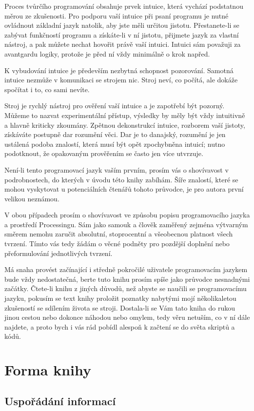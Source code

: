 \documentclass[10pt]{book}
\newcommand{\oddil}[1]{\section{#1}\index{#1}\label{#1}}
\newcommand{\pododdil}[1]{\subsection{#1}\index{#1}\label{#1}}
\begin{document}
Proces tvůrčího programování obsahuje prvek intuice, která vychází podstatnou měrou ze zkušenosti. Pro podporu vaší intuice při psaní programu je nutné ovládnout základní jazyk natolik, aby jste měli určitou jistotu. Přestanete-li se zabývat funkčností programu a získáte-li v ní jistotu, přijmete jazyk za vlastní nástroj, a pak můžete nechat hovořit právě vaší intuici. Intuici sám považuji za avantgardu logiky, protože je před ní vždy minimálně o krok napřed.

K vybudování intuice je především nezbytná schopnost pozorování. Samotná intuice nezmůže v komunikaci se strojem nic. Stroj neví, co počítá, ale dokáže spočítat i to, co sami nevíte.

Stroj je rychlý nástroj pro ověření vaší intuice a je zapotřebí být pozorný. Můžeme to nazvat experimentální přístup, výsledky by měly být vždy intuitivně a hlavně kriticky zkoumány. Zpětnou dekonstrukcí intuice, rozborem vaší jistoty, získáváte postupně dar rozumění věci. Dar je to danajský, rozumění je jen ustálená podoba znalostí, která musí být opět zpochybněna intuicí; nutno podotknout, že opakovaným prověřením se často jen více utvrzuje. 

Není-li tento programovací jazyk vaším prvním, prosím vás o shovívavost v podrobnostech, do kterých v úvodu této knihy zabíhám. Šíře znalostí, které se mohou vyskytovat u potenciálních čtenářů tohoto průvodce, je pro autora první velikou neznámou.

V obou případech prosím o shovívavost ve způsobu popisu programovacího jazyka a prostředí Processingu. Sám jako samouk a člověk zaměřený zejména výtvarným směrem nemohu zaručit absolutní, stoprocentní a všeobecnou platnost všech tvrzení. Tímto vás tedy žádám o věcné podněty pro pozdější doplnění nebo přeformulování jednotlivých tvrzení.

Má snaha provést začínající i středně pokročilé uživatele programovacím jazykem bude vždy nedostatečná, berte tuto knihu prosím spíše jako průvodce nesnadnými začátky. Čtete-li knihu z jiných důvodů, než abyste se naučili se programovacímu jazyku, pokusím se text knihy proložit poznatky nabytými mojí několikaletou zkušeností se sdílením života se stroji. Dostala-li se Vám tato kniha do rukou jinou cestou nebo dokonce náhodou nebo omylem, tedy věru netuším, co v ní dále najdete, a proto bych i vás rád pobídl alespoň k začtení se do světa skriptů a kódů.

\oddil{Forma knihy}

\pododdil{Uspořádání informací}
\end{document}
